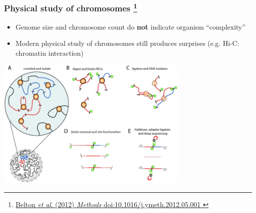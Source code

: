 %
\begin{frame}
  \frametitle{Physical study of chromosomes
  \footnote{\tiny{\href{http://dx.doi.org/10.1016/j.ymeth.2012.05.001
}{Belton \textit{et al}. (2012) \textit{Methods} doi:10.1016/j.ymeth.2012.05.001
}}}
  }
  \begin{itemize}
    \item \textcolor{hutton_green}{Genome size and chromosome count do \textbf{not} indicate organism ``complexity''}
    \item \textcolor{hutton_blue}{Modern physical study of chromosomes still produces surprises (e.g. Hi-C: chromatin interaction)}
  \end{itemize}
  \begin{center}
    \includegraphics[width=0.7\textwidth]{images/nihms418977f1}
  \end{center}  
\end{frame}

